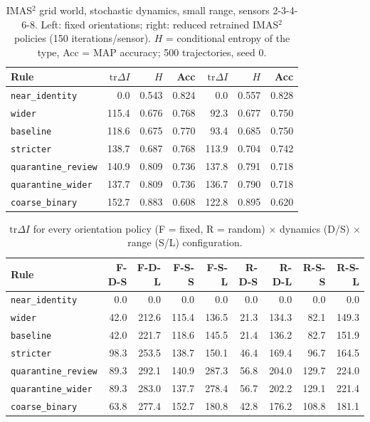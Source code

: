 \documentclass[11pt,a4paper]{article}
\begin{document}
\begin{table}[t]
\centering
\caption{IMAS$^2$ grid world, stochastic dynamics, small range, sensors 2-3-4-6-8. Left: fixed orientations; right: reduced retrained IMAS$^2$ policies (150 iterations/sensor). $H$ = conditional entropy of the type, Acc = MAP accuracy; 500 trajectories, seed 0.}
\label{tab:imas2-main}
\begin{tabular}{lrrrrrr}
\toprule
Rule & $\mathrm{tr}\Delta I$ & $H$ & Acc & $\mathrm{tr}\Delta I$ & $H$ & Acc \\
\midrule
\texttt{near\_identity} & 0.0 & 0.543 & 0.824 & 0.0 & 0.557 & 0.828 \\
\texttt{wider} & 115.4 & 0.676 & 0.768 & 92.3 & 0.677 & 0.750 \\
\texttt{baseline} & 118.6 & 0.675 & 0.770 & 93.4 & 0.685 & 0.750 \\
\texttt{stricter} & 138.7 & 0.687 & 0.768 & 113.9 & 0.704 & 0.742 \\
\texttt{quarantine\_review} & 140.9 & 0.809 & 0.736 & 137.8 & 0.791 & 0.718 \\
\texttt{quarantine\_wider} & 137.7 & 0.809 & 0.736 & 136.7 & 0.790 & 0.718 \\
\texttt{coarse\_binary} & 152.7 & 0.883 & 0.608 & 122.8 & 0.895 & 0.620 \\
\bottomrule
\end{tabular}
\end{table}

\begin{table}[t]
\centering
\footnotesize
\caption{$\mathrm{tr}\Delta I$ for every orientation policy (F = fixed, R = random) $\times$ dynamics (D/S) $\times$ range (S/L) configuration.}
\label{tab:imas2-all}
\begin{tabular}{lrrrrrrrr}
\toprule
Rule & F-D-S & F-D-L & F-S-S & F-S-L & R-D-S & R-D-L & R-S-S & R-S-L \\
\midrule
\texttt{near\_identity} & 0.0 & 0.0 & 0.0 & 0.0 & 0.0 & 0.0 & 0.0 & 0.0 \\
\texttt{wider} & 42.0 & 212.6 & 115.4 & 136.5 & 21.3 & 134.3 & 82.1 & 149.3 \\
\texttt{baseline} & 42.0 & 221.7 & 118.6 & 145.5 & 21.4 & 136.2 & 82.7 & 151.9 \\
\texttt{stricter} & 98.3 & 253.5 & 138.7 & 150.1 & 46.4 & 169.4 & 96.7 & 164.5 \\
\texttt{quarantine\_review} & 89.3 & 292.1 & 140.9 & 287.3 & 56.8 & 204.0 & 129.7 & 224.0 \\
\texttt{quarantine\_wider} & 89.3 & 283.0 & 137.7 & 278.4 & 56.7 & 202.2 & 129.1 & 221.4 \\
\texttt{coarse\_binary} & 63.8 & 277.4 & 152.7 & 180.8 & 42.8 & 176.2 & 108.8 & 181.1 \\
\bottomrule
\end{tabular}
\end{table}
\end{document}
